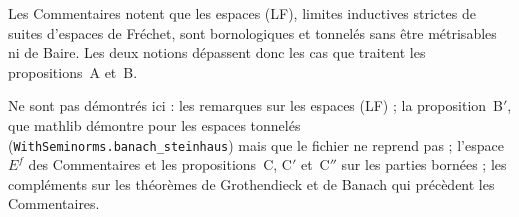 \begin{remarque}
Les Commentaires notent que les espaces (LF), limites inductives strictes de suites d'espaces de Fréchet, sont bornologiques et tonnelés sans être métrisables ni de Baire. Les deux notions dépassent donc les cas que traitent les propositions~A et~B.
\end{remarque}

Ne sont pas démontrés ici : les remarques sur les espaces (LF) ; la proposition~B$'$, que mathlib démontre pour les espaces tonnelés (\texttt{WithSeminorms.\allowbreak{}banach\_steinhaus}) mais que le fichier ne reprend pas ; l'espace $E^f$ des Commentaires et les propositions~C, C$'$ et~C$''$ sur les parties bornées ; les compléments sur les théorèmes de Grothendieck et de Banach qui précèdent les Commentaires.
